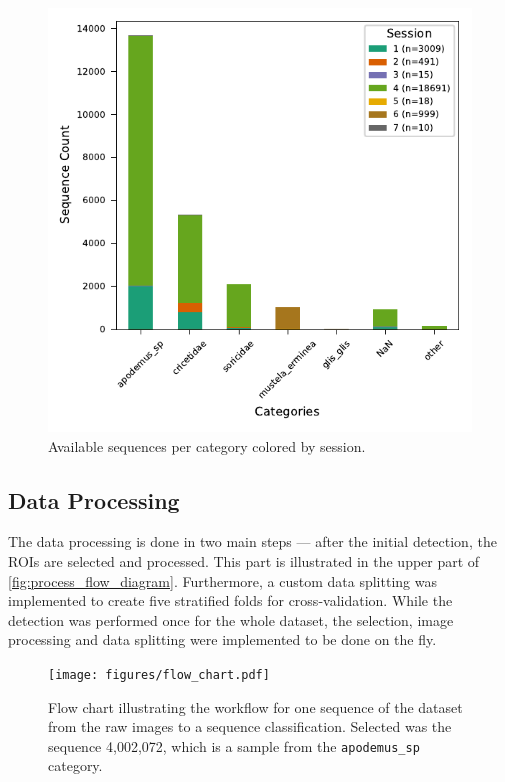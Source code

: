     \begin{figure}[ht]
    \centering
    \includegraphics{figures/label2_session.pdf}
    \caption{Available sequences per category colored by session.}
    \label{fig:sequenceperlabel}
    \end{figure}

    \subsection{Data Processing}

    The data processing is done in two main steps --- after the initial detection, the \acsp{ROI} are selected and processed.
    This part is illustrated in the upper part of \autoref{fig:process_flow_diagram}.
    Furthermore, a custom data splitting was implemented to create five stratified folds for cross-validation.
    While the detection was performed once for the whole dataset, the selection, image processing and data splitting were implemented to be done on the fly.

    \begin{figure}[p]
    \centering
    \texttt{[image: figures/flow\_chart.pdf]}
    \caption{
        Flow chart illustrating the workflow for one sequence of the dataset from the raw images to a sequence classification. 
        Selected was the sequence 4,002,072, which is a sample from the \texttt{apodemus\_sp} category.
        }
    \label{fig:process_flow_diagram}
    \end{figure}

